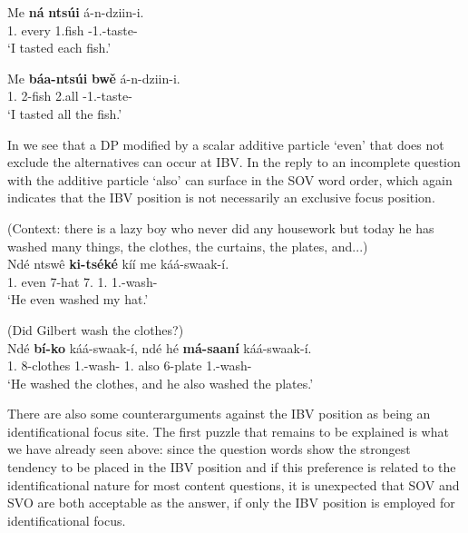 \documentclass[output=paper,colorlinks,citecolor=brown,
]{langscibook}
\begin{document}
\begin{exe}
    \ex \label{84}
    \begin{xlist}
\ex
\label{84a}
\gll
Me \textbf{ná} \textbf{ntsúi} á-n-dziin-i.\\
1\Sg{}.\Pro{} every 1.fish \Pst{}-1\Sg{}.\Sm{}-taste-\Pst{}\\
\trans ‘I tasted each fish.’

\ex
\label{84b}
\gll
Me \textbf{báa-ntsúi} \textbf{bwě} á-n-dziin-i.\\
1\Sg{}.\Pro{} 2-fish 2.all \Pst{}-1\Sg{}.\Sm{}-taste-\Pst{}\\
\trans ‘I tasted all the fish.’

    \end{xlist}
\end{exe}
In  we see that a DP modified by a scalar additive particle `even' that does not exclude the alternatives can occur at IBV. In  the reply to an incomplete question with the additive particle `also' can surface in the SOV word order, which again indicates that the IBV position is not necessarily an exclusive focus position.
\begin{exe}
\ex
\label{85}
 (Context: there is a lazy boy who never did any housework but today he has washed many things, the clothes, the curtains, the plates, and...)\\
\gll
Ndé ntswê \textbf{ki-tséké} kíí me káá-swaak-í.\\
1.\Pro{} even 7-hat 7.\Conn{} 1\Sg{}.\Pro{} 1\Sm{}.\Pst{}-wash-\Pst{}\\
\trans ‘He even washed my hat.’

\end{exe}
\begin{exe}
\ex
\label{86}
 (Did Gilbert wash the clothes?)\\
\gll
Ndé \textbf{bí-ko} káá-swaak-í, ndé hé \textbf{má-saaní} káá-swaak-í.\\
1.\Pro{} 8-clothes 1\Sm{}.\Pst{}-wash-\Pst{} 1.\Pro{} also 6-plate 1\Sm{}.\Pst{}-wash-\Pst{}\\
\trans ‘He washed the clothes, and he also washed the plates.’

\end{exe}
There are also some counterarguments against the IBV position as being an identificational focus site. The first puzzle that remains to be explained is what we have already seen above: since the question words show the strongest tendency to be placed in the IBV position and if this preference is related to the identificational nature for most content questions, it is unexpected that SOV and SVO are both acceptable as the answer, if only the IBV position is employed for identificational focus.
\end{document}
